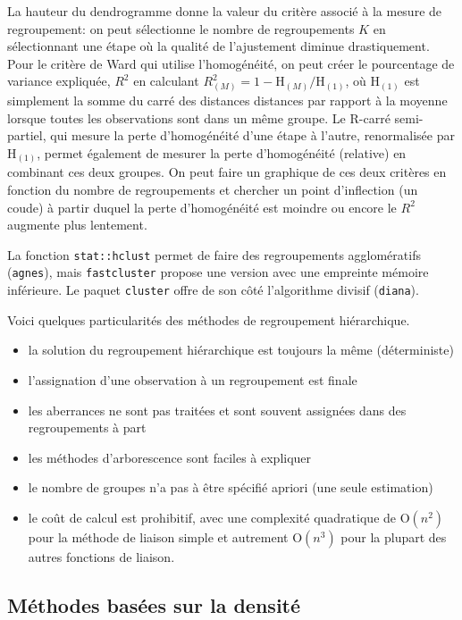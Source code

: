 \documentclass[
  11pt,
  letterpaper,
]{scrbook}
\providecommand{\tightlist}{%
  \setlength{\itemsep}{0pt}\setlength{\parskip}{0pt}}\usepackage{longtable,booktabs,array}
\theoremstyle{definition}
\theoremstyle{remark}
\begin{document}
La hauteur du dendrogramme donne la valeur du critère associé à la
mesure de regroupement: on peut sélectionne le nombre de regroupements
\(K\) en sélectionnant une étape où la qualité de l'ajustement diminue
drastiquement. Pour le critère de Ward qui utilise l'homogénéité, on
peut créer le pourcentage de variance expliquée, \(R^2\) en calculant
\(R^2_{(M)} = 1-\mathrm{H}_{(M)}/\mathrm{H}_{(1)}\), où
\(\mathrm{H}_{(1)}\) est simplement la somme du carré des distances
distances par rapport à la moyenne lorsque toutes les observations sont
dans un même groupe. Le R-carré semi-partiel, qui mesure la perte
d'homogénéité d'une étape à l'autre, renormalisée par
\(\mathrm{H}_{(1)}\), permet également de mesurer la perte d'homogénéité
(relative) en combinant ces deux groupes. On peut faire un graphique de
ces deux critères en fonction du nombre de regroupements et chercher un
point d'inflection (un coude) à partir duquel la perte d'homogénéité est
moindre ou encore le \(R^2\) augmente plus lentement.

La fonction \texttt{stat::hclust} permet de faire des regroupements
agglomératifs (\texttt{agnes}), mais \texttt{fastcluster} propose une
version avec une empreinte mémoire inférieure. Le paquet
\texttt{cluster} offre de son côté l'algorithme divisif
(\texttt{diana}).

Voici quelques particularités des méthodes de regroupement hiérarchique.

\begin{itemize}
\tightlist
\item
  la solution du regroupement hiérarchique est toujours la même
  (déterministe)
\item
  l'assignation d'une observation à un regroupement est finale
\item
  les aberrances ne sont pas traitées et sont souvent assignées dans des
  regroupements à part
\item
  les méthodes d'arborescence sont faciles à expliquer
\item
  le nombre de groupes n'a pas à être spécifié apriori (une seule
  estimation)
\item
  le coût de calcul est prohibitif, avec une complexité quadratique de
  \(\mathrm{O}(n^2)\) pour la méthode de liaison simple et autrement
  \(\mathrm{O}(n^3)\) pour la plupart des autres fonctions de liaison.
\end{itemize}

\hypertarget{muxe9thodes-basuxe9es-sur-la-densituxe9}{%
\subsection{Méthodes basées sur la
densité}\label{muxe9thodes-basuxe9es-sur-la-densituxe9}}
\end{document}
